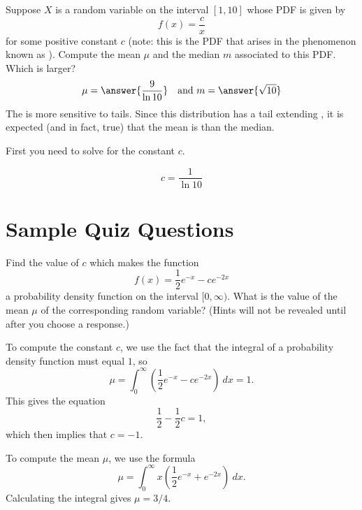\documentclass{ximera}
\begin{document}
\begin{exercise}
Suppose $X$ is a random variable on the interval $[1,10]$ whose PDF is given by 
\[ f(x) = \frac{c}{x} \]
for some positive constant $c$ (note: this is the PDF that arises in the phenomenon known as ). Compute the mean $\mu$ and the median $m$ associated to this PDF. Which is larger?
\[ \mu = \answer{\frac{9}{\ln 10}} \ \ \text{ and } m = \answer{\sqrt{10}} \]
The  is more sensitive to tails. Since this distribution has a tail extending , it is expected (and in fact, true) that the mean is  than the median.
\begin{hint}
First you need to solve for the constant $c$.
\begin{hint}
\[ c = \frac{1}{\ln 10} \]
\end{hint}
\end{hint}
\end{exercise}


\section*{Sample Quiz Questions}
\begin{question}%

Find the value of \(c\) which makes the function
\[f(x) = \frac{1}{2}e^{-x} - ce^{-2x}\]
a probability density function on the interval \([0, \infty)\). 
What is the value of the mean \(\mu\) of the corresponding random variable? (Hints will not be revealed until after you choose a response.)
\begin{multiplechoice}
\end{multiplechoice}
\begin{feedback}
To compute the constant \(c\), we use the fact that the integral of a probability density function must equal \(1\), so 
\[ \mu = \int_{0}^{\infty} \left( \frac{1}{2}e^{-x} - ce^{-2x} \right) ~ dx = 1.\]
This gives the equation \[\frac{1}{2} - \frac{1}{2}c = 1,\]
which then implies that \(c = -1\). \begin{hint} To compute the mean \(\mu\), we use the formula
\[ \mu = \int_{0}^{\infty} x \left( \frac{1}{2}e^{-x} + e^{-2x} \right) ~ dx.\]
 Calculating the integral gives \(\mu = 3/4.\) \end{hint}
\end{feedback}
\end{question}
\end{document}
